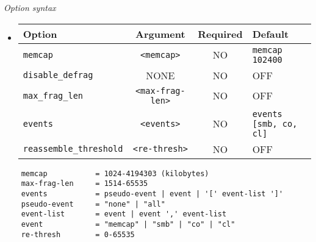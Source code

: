 \documentclass[english]{report}
\begin{document}
\textit{Option syntax}
\begin{itemize}

\item[]
\begin{tabular}{|l|c|c|p{6cm}|}
\hline
Option & Argument & Required & Default\\
\hline
\hline
\texttt{memcap} & \texttt{<memcap>} & NO & \texttt{memcap 102400}\\
\hline
\texttt{disable\_defrag} & NONE & NO & OFF\\
\hline
\texttt{max\_frag\_len} & \texttt{<max-frag-len>} & NO & OFF\\
\hline
\texttt{events} & \texttt{<events>} & NO & \texttt{events [smb, co, cl]}\\
\hline
\texttt{reassemble\_threshold} & \texttt{<re-thresh>} & NO & OFF\\
\hline
\end{tabular}
\end{itemize}

\footnotesize
\begin{verbatim}
    memcap           = 1024-4194303 (kilobytes)
    max-frag-len     = 1514-65535
    events           = pseudo-event | event | '[' event-list ']'
    pseudo-event     = "none" | "all"
    event-list       = event | event ',' event-list
    event            = "memcap" | "smb" | "co" | "cl"
    re-thresh        = 0-65535
\end{verbatim}
\normalsize
\end{document}

